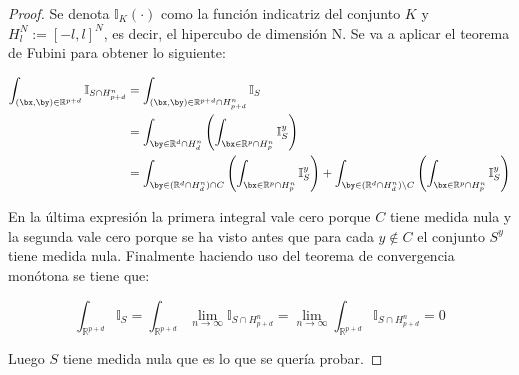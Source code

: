\begin{proof}
Se denota $\mathbb{I}_K(\cdot)$ como la función indicatriz del conjunto $K$ y $H^N_l:=[-l,l]^N$, es decir, el hipercubo de dimensión N. Se va a aplicar el teorema de Fubini para obtener lo siguiente:

\begin{align*}
\int_{(\bx,\by)\in\mathbb{R}^{p+d}} \mathbb{I}_{S\cap H^n_{p+d}} &= \int_{(\bx,\by)\in \mathbb{R}^{p+d}\cap H^n_{p+d}} \mathbb{I}_S \\
&= \int_{\by\in \mathbb{R}^{d}\cap H^n_{d}} \left( \int_{\bx\in \mathbb{R}^{p}\cap H^n_{p}} \mathbb{I}_S^y \right) \\ 
&= \int_{\by\in (\mathbb{R}^{d}\cap H^n_{d}) \cap C} \left( \int_{\bx\in \mathbb{R}^{p}\cap H^n_{p}} \mathbb{I}_S^y \right) + 
\int_{\by\in (\mathbb{R}^{d}\cap H^n_{d})\setminus C} \left( \int_{\bx\in \mathbb{R}^{p}\cap H^n_{p}} \mathbb{I}_S^y \right)
\end{align*}

En la última expresión la primera integral vale cero porque $C$ tiene medida nula y la segunda vale cero porque se ha visto antes que para cada $y\notin C$ el conjunto $S^y$ tiene medida nula. Finalmente haciendo uso del teorema de convergencia monótona se tiene que:

$$
\int_{\mathbb{R}^{p+d}} \mathbb{I}_S = \int_{\mathbb{R}^{p+d}} \lim_{n\rightarrow \infty} \mathbb{I}_{S\cap H^n_{p+d}} 
= \lim_{n\rightarrow \infty} \int_{\mathbb{R}^{p+d}} \mathbb{I}_{S\cap H^n_{p+d}} = 0
$$

Luego $S$ tiene medida nula que es lo que se quería probar.
\end{proof}

